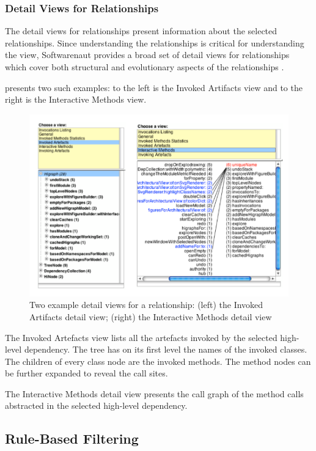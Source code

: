 \documentclass[preprint,12pt]{elsarticle}
\begin{document}
\subsubsection {Detail Views for Relationships}

The detail views for relationships present information about the selected relationships. Since understanding the relationships is critical for understanding the view, Softwarenaut provides a broad set of detail views for relationships which cover both structural and evolutionary aspects of the relationships \cite{lungu-cutedge, lungu-relevo}. 

 presents two such examples: to the left is the Invoked Artifacts view and to the right is the Interactive Methods view. 

\begin{figure}[ht]
\begin{center}
\includegraphics[width=0.8\linewidth]{DetailsForEdge}
\caption{Two example detail views for a relationship: (left) the Invoked Artifacts detail view; (right) the Interactive Methods detail view}
\end{center}
\end{figure}

The Invoked Artefacts view lists all the artefacts invoked by the selected high-level dependency. The tree has on its first level the names of the invoked classes. The children of every class node are the invoked methods. The method nodes can be further expanded to reveal the call sites. 

The Interactive Methods detail view presents the call graph of the method calls abstracted in the selected high-level dependency. 

\subsection {Rule-Based Filtering}
\end{document}
